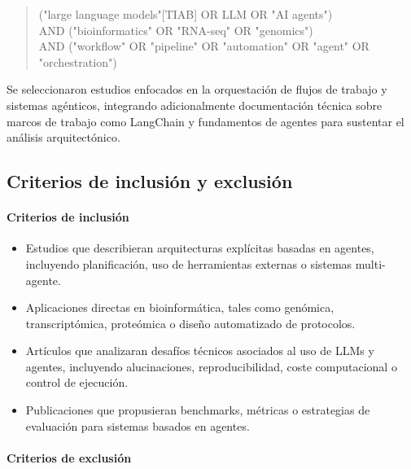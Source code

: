 \begin{quote}\footnotesize\ttfamily\raggedright
("large language models"[TIAB] OR LLM OR "AI agents") \\
\hspace*{1em}AND ("bioinformatics" OR "RNA-seq" OR "genomics") \\
\hspace*{1em}AND ("workflow" OR "pipeline" OR "automation" OR "agent" OR "orchestration")
\end{quote}

Se seleccionaron estudios enfocados en la orquestación de flujos de trabajo y 
sistemas agénticos, integrando adicionalmente documentación técnica sobre 
marcos de trabajo como LangChain y fundamentos de agentes para sustentar el 
análisis arquitectónico.

\subsection{Criterios de inclusión y exclusión}

\paragraph{Criterios de inclusión}

\begin{itemize}
  \item Estudios que describieran arquitecturas explícitas basadas en agentes, incluyendo planificación, uso de herramientas externas o sistemas multi-agente.
  \item Aplicaciones directas en bioinformática, tales como genómica, transcriptómica, proteómica o diseño automatizado de protocolos.
  \item Artículos que analizaran desafíos técnicos asociados al uso de LLMs y agentes, incluyendo alucinaciones, reproducibilidad, coste computacional o control de ejecución.
  \item Publicaciones que propusieran benchmarks, métricas o estrategias de evaluación para sistemas basados en agentes.
\end{itemize}

\paragraph{Criterios de exclusión}

